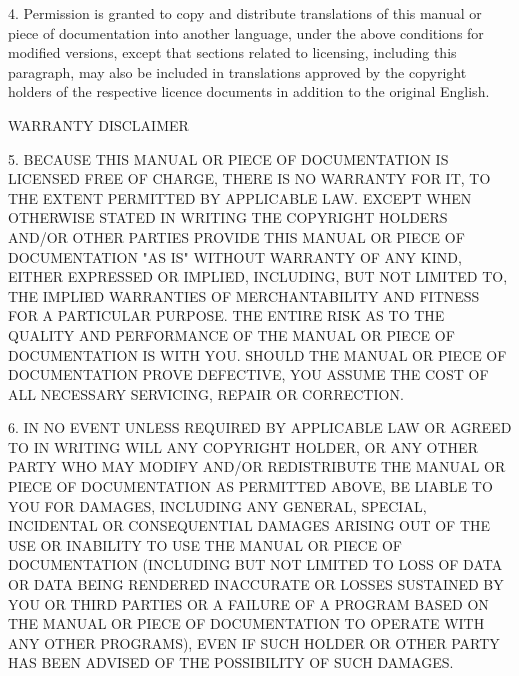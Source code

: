 4. Permission is granted to copy and distribute translations of this manual
or piece of documentation into another language, under the above conditions
for modified versions, except that sections related to licensing, including
this paragraph, may also be included in translations approved by the
copyright holders of the respective licence documents in addition to the
original English.

\begin{center}
	WARRANTY DISCLAIMER
\end{center}

5. BECAUSE THIS MANUAL OR PIECE OF DOCUMENTATION IS LICENSED FREE OF
CHARGE, THERE IS NO WARRANTY FOR IT, TO THE EXTENT PERMITTED BY APPLICABLE
LAW.  EXCEPT WHEN OTHERWISE STATED IN WRITING THE COPYRIGHT HOLDERS AND/OR
OTHER PARTIES PROVIDE THIS MANUAL OR PIECE OF DOCUMENTATION "AS IS" WITHOUT
WARRANTY OF ANY KIND, EITHER EXPRESSED OR IMPLIED, INCLUDING, BUT NOT
LIMITED TO, THE IMPLIED WARRANTIES OF MERCHANTABILITY AND FITNESS FOR A
PARTICULAR PURPOSE.  THE ENTIRE RISK AS TO THE QUALITY AND PERFORMANCE OF
THE MANUAL OR PIECE OF DOCUMENTATION IS WITH YOU.  SHOULD THE MANUAL OR
PIECE OF DOCUMENTATION PROVE DEFECTIVE, YOU ASSUME THE COST OF ALL
NECESSARY SERVICING, REPAIR OR CORRECTION.

6. IN NO EVENT UNLESS REQUIRED BY APPLICABLE LAW OR AGREED TO IN WRITING
WILL ANY COPYRIGHT HOLDER, OR ANY OTHER PARTY WHO MAY MODIFY AND/OR
REDISTRIBUTE THE MANUAL OR PIECE OF DOCUMENTATION AS PERMITTED ABOVE, BE
LIABLE TO YOU FOR DAMAGES, INCLUDING ANY GENERAL, SPECIAL, INCIDENTAL OR
CONSEQUENTIAL DAMAGES ARISING OUT OF THE USE OR INABILITY TO USE THE MANUAL
OR PIECE OF DOCUMENTATION (INCLUDING BUT NOT LIMITED TO LOSS OF DATA OR
DATA BEING RENDERED INACCURATE OR LOSSES SUSTAINED BY YOU OR THIRD PARTIES
OR A FAILURE OF A PROGRAM BASED ON THE MANUAL OR PIECE OF DOCUMENTATION TO
OPERATE WITH ANY OTHER PROGRAMS), EVEN IF SUCH HOLDER OR OTHER PARTY HAS
BEEN ADVISED OF THE POSSIBILITY OF SUCH DAMAGES.

